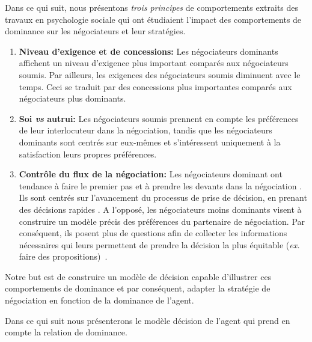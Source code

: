 	Dans ce qui suit, nous présentons \emph{trois principes} de comportements extraits des travaux en psychologie sociale qui ont étudiaient l'impact des comportements de dominance sur les négociateurs et leur stratégies.
	
	\begin{enumerate}
		\item \textbf{Niveau d'exigence et de concessions:} Les négociateurs dominants affichent un niveau d'exigence plus important comparés aux négociateurs soumis. Par ailleurs, les exigences des négociateurs soumis diminuent avec le temps. Ceci se traduit par des concessions plus importantes comparés aux négociateurs plus dominants. \cite{de1995impact}
		
		\item \textbf{Soi \emph{vs} autrui:} Les négociateurs soumis prennent en compte les préférences de leur interlocuteur dans la négociation, tandis que les négociateurs  dominants sont centrés sur eux-mêmes et s'intéressent uniquement à la satisfaction leurs propres préférences. \cite{fiske1993controlling,de1995impact}
		
		\item \textbf{Contrôle du flux de la négociation:}
		Les négociateurs dominant ont tendance à faire le premier pas et à prendre les devants dans la négociation \cite {magee2007power}. Ils sont centrés sur l'avancement du processus de prise de décision, en prenant des décisions rapides \cite{zablotskaya2012relating}.
		A l'opposé, les négociateurs moins dominants visent à construire un modèle précis des préférences du partenaire de négociation. 
		Par conséquent,  ils posent plus de questions afin de collecter les informations nécessaires qui leurs permettent de prendre la décision la plus équitable (\emph{ex.}  faire des propositions)~\cite{de2004influence}. 
		
	\end{enumerate}
	
	
	Notre but est de construire un modèle de décision capable d'illustrer ces comportements de dominance et par conséquent, adapter la stratégie de négociation en fonction de la dominance de l'agent.
	
	Dans ce qui suit nous présenterons le modèle décision de l'agent qui prend en compte la relation de dominance.
	
	
